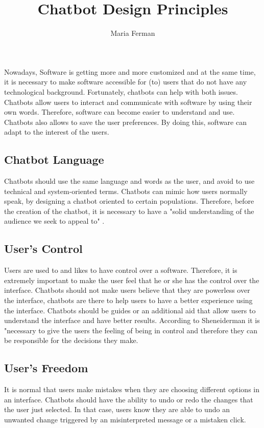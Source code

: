 \documentclass[a4paper,10pt]{article}
\title{Chatbot Design Principles}
\author{Maria Ferman}
\begin{document}
\maketitle

Nowadays, Software is getting more and more customized and at the same time, it is necessary to make software accessible for (to) users that do not have any technological background. Fortunately, chatbots can help with both issues. Chatbots allow users to interact and communicate with software by using their own words. Therefore, software can become easier to understand and use. Chatbots also allows to save the user preferences. By doing this, software can adapt to the interest of the users.   

\subsection*{Chatbot Language}

Chatbots should use the same language and words as the user, and avoid to use technical and system-oriented terms. Chatbots can mimic how users normally speak, by designing a chatbot oriented to certain populations. Therefore, before the creation of the chatbot, it is necessary to have a "solid understanding of the audience we seek to appeal to" \cite{HeuristicsWebPage}.  

\subsection*{User's Control}

Users are used to and likes to have control over a software. Therefore, it is extremely important to make the user feel that he or she has the control over the interface. Chatbots should not make users believe that they are powerless over the interface, chatbots are there to help users to have a better experience using the interface. Chatbots should be guides or an additional aid that allow users to understand the interface and have better results. According to Sheneiderman \cite{shneiderman1997direct} it is "necessary to give the users the feeling of being in control and therefore they can be responsible for the decisions they make.  

\subsection*{User's Freedom}

It is normal that users make mistakes when they are choosing different options in an interface. Chatbots should have the ability to undo or redo the changes that the user just selected. In that case, users know they are able to undo an unwanted change triggered by an misinterpreted message or a mistaken click. 

\medskip


\end{document}
